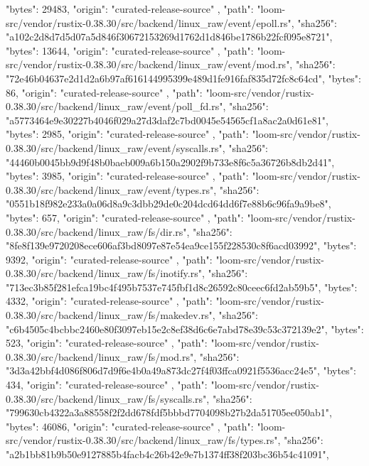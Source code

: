 {{      "bytes": 29483,
      "origin": "curated-release-source"
    },
    {
      "path": "loom-src/vendor/rustix-0.38.30/src/backend/linux_raw/event/epoll.rs",
      "sha256": "a102c2d8d7d5d07a5d846f30672153269d1762d1d846be1786b22fcf095e8721",
      "bytes": 13644,
      "origin": "curated-release-source"
    },
    {
      "path": "loom-src/vendor/rustix-0.38.30/src/backend/linux_raw/event/mod.rs",
      "sha256": "72e46b04637e2d1d2a6b97af616144995399e489d1fe916faf835d72fc8c64cd",
      "bytes": 86,
      "origin": "curated-release-source"
    },
    {
      "path": "loom-src/vendor/rustix-0.38.30/src/backend/linux_raw/event/poll_fd.rs",
      "sha256": "a5773464e9e30227b4046f029a27d3daf2c7bd0045e54565cf1a8ac2a0d61e81",
      "bytes": 2985,
      "origin": "curated-release-source"
    },
    {
      "path": "loom-src/vendor/rustix-0.38.30/src/backend/linux_raw/event/syscalls.rs",
      "sha256": "44460b0045bb9d9f48b0baeb009a6b150a2902f9b733e8f6c5a36726b8db2d41",
      "bytes": 3985,
      "origin": "curated-release-source"
    },
    {
      "path": "loom-src/vendor/rustix-0.38.30/src/backend/linux_raw/event/types.rs",
      "sha256": "0551b18f982e233a0a06d8a9c3dbb29de0c204dcd64dd6f7e88b6c96fa9a9be8",
      "bytes": 657,
      "origin": "curated-release-source"
    },
    {
      "path": "loom-src/vendor/rustix-0.38.30/src/backend/linux_raw/fs/dir.rs",
      "sha256": "8fe8f139e9720208ece606af3bd8097e87e54ea9ce155f228530c8f6acd03992",
      "bytes": 9392,
      "origin": "curated-release-source"
    },
    {
      "path": "loom-src/vendor/rustix-0.38.30/src/backend/linux_raw/fs/inotify.rs",
      "sha256": "713ec3b85f281efca19bc4f495b7537e745fbf1d8c26592c80ceec6fd2ab59b5",
      "bytes": 4332,
      "origin": "curated-release-source"
    },
    {
      "path": "loom-src/vendor/rustix-0.38.30/src/backend/linux_raw/fs/makedev.rs",
      "sha256": "c6b4505c4bcbbc2460e80f3097eb15e2c8ef38d6c6e7abd78e39c53c372139e2",
      "bytes": 523,
      "origin": "curated-release-source"
    },
    {
      "path": "loom-src/vendor/rustix-0.38.30/src/backend/linux_raw/fs/mod.rs",
      "sha256": "3d3a42bbf4d086f806d7d9f6e4b0a49a873dc27f4f03ffca0921f5536acc24e5",
      "bytes": 434,
      "origin": "curated-release-source"
    },
    {
      "path": "loom-src/vendor/rustix-0.38.30/src/backend/linux_raw/fs/syscalls.rs",
      "sha256": "799630cb4322a3a88558f2f2dd678fdf5bbbd7704098b27b2da51705ee050ab1",
      "bytes": 46086,
      "origin": "curated-release-source"
    },
    {
      "path": "loom-src/vendor/rustix-0.38.30/src/backend/linux_raw/fs/types.rs",
      "sha256": "a2b1bb81b9b50e9127885b4facb4c26b42e9e7b1374ff38f203bc36b54c41091",
}}
